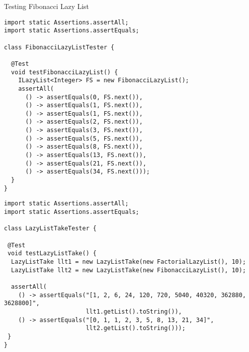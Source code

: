 \begin{cl}{Testing Fibonacci Lazy List}
\begin{lstlisting}[language=MyJava]
import static Assertions.assertAll;
import static Assertions.assertEquals;

class FibonacciLazyListTester {

  @Test
  void testFibonacciLazyList() {
    ILazyList<Integer> FS = new FibonacciLazyList();
    assertAll(
      () -> assertEquals(0, FS.next()),
      () -> assertEquals(1, FS.next()),
      () -> assertEquals(1, FS.next()),
      () -> assertEquals(2, FS.next()),
      () -> assertEquals(3, FS.next()),
      () -> assertEquals(5, FS.next()),
      () -> assertEquals(8, FS.next()),
      () -> assertEquals(13, FS.next()),
      () -> assertEquals(21, FS.next()),
      () -> assertEquals(34, FS.next()));
  }
}
\end{lstlisting}
\end{cl}


\begin{cl}[]{}
\begin{lstlisting}[language=MyJava]
import static Assertions.assertAll;
import static Assertions.assertEquals;

class LazyListTakeTester {

 @Test
 void testLazyListTake() {
  LazyListTake llt1 = new LazyListTake(new FactorialLazyList(), 10);
  LazyListTake llt2 = new LazyListTake(new FibonacciLazyList(), 10);

  assertAll(
    () -> assertEquals("[1, 2, 6, 24, 120, 720, 5040, 40320, 362880, 3628800]",
                       llt1.getList().toString()),
    () -> assertEquals("[0, 1, 1, 2, 3, 5, 8, 13, 21, 34]",
                       llt2.getList().toString()));
 }
}
\end{lstlisting}
\end{cl}


